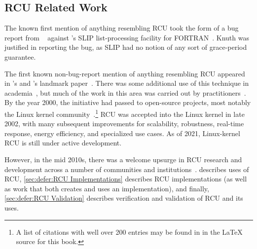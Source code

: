 
\subsection{RCU Related Work}
\label{sec:defer:RCU Related Work}

The known first mention of anything resembling RCU took the form of a bug
report from
~\cite[page 413 of Fundamental Algorithms]{Knuth73}
against 's SLIP list-processing facility for
FORTRAN~\cite{Weizenbaum:1963:SLP:367593.367617}.
Knuth was justified in reporting the bug, as SLIP had no notion of
any sort of grace-period guarantee.

The first known non-bug-report mention of anything resembling RCU appeared
in 's and 's landmark
paper~\cite{Kung80}.
There was some additional use of this technique in
academia~\cite{Manber82,Manber84,BarbaraLiskov1988ArgusCACM,Pugh90,Andrews91textbook,Pu95a,Cowan96a,Rastogi:1997:LPV:645923.671017,Gamsa99},
but much of the work in this area was carried out by
practitioners~\cite{RichardRashid87a,Hennessy89,Jacobson93,AjuJohn95,Slingwine95,Slingwine97,Slingwine98,McKenney98}.
By the year 2000, the initiative had passed to open-source projects,
most notably the Linux kernel
community~\cite{RustyRussell2000a,RustyRussell2000b,McKenney01b,McKenney01a,McKenney02a,Arcangeli03}.\footnote{
	A list of citations with well over 200 entries may be found in
	 in the {\LaTeX} source for this book.}
RCU was accepted into the Linux kernel in late 2002, with many subsequent
improvements for scalability, robustness, real-time response, energy
efficiency, and specialized use cases.
As of 2021, Linux-kernel RCU is still under active development.

However, in the mid 2010s, there was a welcome upsurge in RCU research
and development across a number of communities and
institutions~\cite{FransKaashoek2015ParallelOSHistory}.
 describes uses of RCU,
\cref{sec:defer:RCU Implementations} describes RCU implementations
(as well as work that both creates and uses an implementation),
and finally,
\cref{sec:defer:RCU Validation} describes verification and validation
of RCU and its uses.

